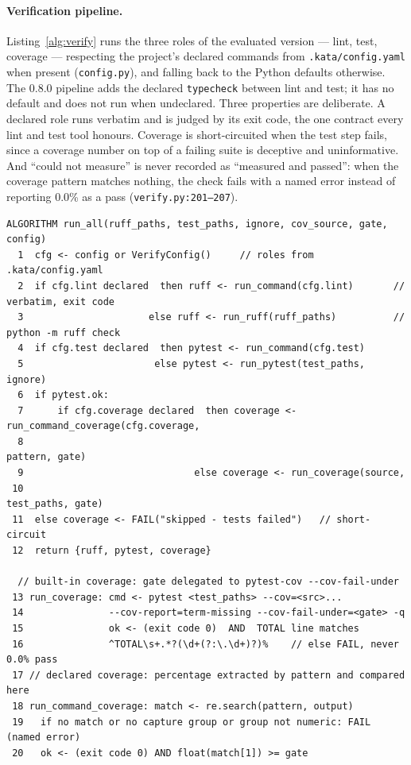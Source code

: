 \documentclass{sbc2019}%
\begin{document}
\paragraph{Verification pipeline.} Listing~\ref{alg:verify} runs the three
roles of the evaluated version --- lint, test, coverage --- respecting the
project's declared commands from \texttt{.kata/config.yaml} when present
(\texttt{config.py}), and falling back to the Python defaults otherwise. The
0.8.0 pipeline adds the declared \texttt{typecheck} between lint and test;
it has no default and does not run when undeclared. Three properties are
deliberate. A declared role runs verbatim and is judged by its exit
code, the one contract every lint and test tool honours. Coverage
is short-circuited when the test step fails, since a coverage number on top of a
failing suite is deceptive and uninformative. And ``could not measure'' is never recorded as
``measured and passed'': when the coverage pattern matches nothing, the
check fails with a named error instead of reporting 0.0\% as a pass
(\texttt{verify.py:201--207}).

\begin{lstlisting}[caption=verification pipeline (kata/verify.py).,label=alg:verify]
ALGORITHM run_all(ruff_paths, test_paths, ignore, cov_source, gate, config)
  1  cfg <- config or VerifyConfig()     // roles from .kata/config.yaml
  2  if cfg.lint declared  then ruff <- run_command(cfg.lint)       // verbatim, exit code
  3                      else ruff <- run_ruff(ruff_paths)          // python -m ruff check
  4  if cfg.test declared  then pytest <- run_command(cfg.test)
  5                       else pytest <- run_pytest(test_paths, ignore)
  6  if pytest.ok:
  7      if cfg.coverage declared  then coverage <- run_command_coverage(cfg.coverage,
  8                                                                     pattern, gate)
  9                              else coverage <- run_coverage(source,
 10                                                             test_paths, gate)
 11  else coverage <- FAIL("skipped - tests failed")   // short-circuit
 12  return {ruff, pytest, coverage}

  // built-in coverage: gate delegated to pytest-cov --cov-fail-under
 13 run_coverage: cmd <- pytest <test_paths> --cov=<src>...
 14               --cov-report=term-missing --cov-fail-under=<gate> -q
 15               ok <- (exit code 0)  AND  TOTAL line matches
 16               ^TOTAL\s+.*?(\d+(?:\.\d+)?)%    // else FAIL, never 0.0% pass
 17 // declared coverage: percentage extracted by pattern and compared here
 18 run_command_coverage: match <- re.search(pattern, output)
 19   if no match or no capture group or group not numeric: FAIL (named error)
 20   ok <- (exit code 0) AND float(match[1]) >= gate
\end{lstlisting}
\end{document}
